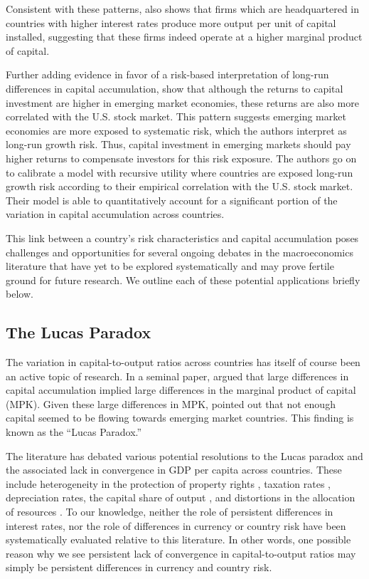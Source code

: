 \documentclass{ar-1col}
\begin{document}
Consistent with these patterns, \citet{Richers2020} also shows that firms which are headquartered in countries with higher interest rates produce more output per unit of capital installed, suggesting that these firms indeed operate at a higher marginal product of capital. 

Further adding evidence in favor of a risk-based interpretation of long-run differences in capital accumulation, \citet{DavidHenriksenSimonovska2014} show that although the returns to capital investment are higher in emerging market economies, these returns are also more correlated with the U.S. stock market. This pattern suggests emerging market economies are more exposed to systematic risk, which the authors interpret as long-run growth risk. Thus, capital investment in emerging markets should pay higher returns to compensate investors for this risk exposure. The authors go on to calibrate a model with recursive utility where countries are exposed long-run growth risk according to their empirical correlation with the U.S. stock market. Their model is able to quantitatively account for a significant portion of the variation in capital accumulation across countries.

This link between a country's risk characteristics and capital accumulation poses challenges and opportunities for several ongoing debates in the macroeconomics literature that have yet to be explored systematically and may prove fertile ground for future research. We outline each of these potential applications briefly below.

\subsection{The Lucas Paradox}

The variation in capital-to-output ratios across countries has itself of course been an active topic of research. In a seminal paper, \citet{Lucas1990} argued that large differences in capital accumulation implied large differences in the marginal product of capital (MPK). Given these large differences in MPK, \citet{Lucas1990} pointed out that not enough capital seemed to be flowing towards emerging market countries. This finding is known as the ``Lucas Paradox.''

The literature has debated various potential resolutions to the Lucas paradox and the associated lack in convergence in GDP per capita across countries. These include heterogeneity in the protection of property rights \citep{HallJones1997}, taxation rates \citep{Jorgenson1996}, depreciation rates, the capital share of output \citep{Neiman2014}, and distortions in the allocation of resources \citep{HsiehKlenow2009}. To our knowledge, neither the role of persistent differences in interest rates, nor the role of differences in currency or country risk have been systematically evaluated relative to this literature. In other words, one possible reason why we see persistent lack of convergence in capital-to-output ratios may simply be persistent differences in currency and country risk. 
\end{document}
